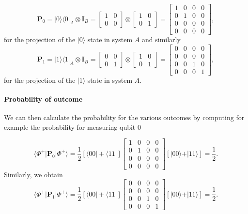 \[
\bm{P}_0=\vert 0\rangle\langle 0\vert_A\otimes \bm{I}_B=\begin{bmatrix} 1 & 0\\ 0 & 0\end{bmatrix}\otimes\begin{bmatrix} 1& 0 \\ 0 & 1\end{bmatrix}=\begin{bmatrix} 1 & 0 & 0 & 0 \\ 0 & 1 & 0 & 0 \\ 0 & 0 & 0 & 0 \\ 0 & 0 & 0 & 0\end{bmatrix},
\]
for the projection of the $\vert 0 \rangle$ state in system $A$ and similarly
\[
\bm{P}_1=\vert 1\rangle\langle 1\vert_A\otimes \bm{I}_B=\begin{bmatrix} 0 & 0\\ 0 & 1\end{bmatrix}\otimes\begin{bmatrix} 1& 0 \\ 0 & 1\end{bmatrix}=\begin{bmatrix} 0 & 0 & 0 & 0 \\ 0 & 0 & 0 & 0 \\ 0 & 0 & 1 & 0 \\ 0 & 0 & 0 & 1\end{bmatrix},
\]
for the projection of the $\vert 1 \rangle$ state in system $A$.


\paragraph{Probability of  outcome}

We can then calculate the probability for the various outcomes by
computing for example the probability for measuring qubit $0$ 

\[
\langle \Phi^+\vert \bm{P}_0\vert \Phi^+\rangle = \frac{1}{2} \left[\langle 00\vert +\langle 11\vert\right]\begin{bmatrix} 1 & 0 & 0 & 0 \\ 0 & 1 & 0 & 0 \\ 0 & 0 & 0 & 0 \\ 0 & 0 & 0 & 0\end{bmatrix}\left[\vert 00\rangle +\vert 11\rangle\right]=\frac{1}{2}.
\]
Similarly, we obtain
\[
\langle \Phi^+\vert \bm{P}_1\vert \Phi^+\rangle = \frac{1}{2}\left[\langle 00\vert +\langle 11\vert\right]\begin{bmatrix} 0 & 0 & 0 & 0 \\ 0 & 0 & 0 & 0 \\ 0 & 0 & 1 & 0 \\ 0 & 0 & 0 & 1\end{bmatrix}\left[\vert 00\rangle +\vert 11\rangle\right]=\frac{1}{2}.
\]


